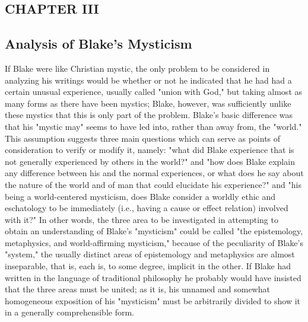 \newpage

\begin{center}
	\section[Chapter III: Analysis of Blake's Mysticism]{CHAPTER III}
	\subsection*{Analysis of Blake's Mysticism}
\end{center}

{}

If Blake were like Christian mystic, the only problem to be considered in analyzing his 
writings would be whether or not he indicated that he had had a certain unusual experience,
usually called "union with God," but taking almost as many forms as there have been mystics; Blake, however,
was sufficiently unlike these mystics that this is only part of the problem. Blake's basic difference was that
his "mystic may" seems to have led into, rather than away from, the "world." This assumption
suggests three main questions which can serve as points of consideration to verify
or modify it, namely: "what did Blake experience that is not generally experienced by others in the world?"
and "how does Blake explain any difference between his and the normal experiences, or what does he say about the 
nature of the world and of man that could elucidate his experience?" and "his being a world-centered mysticism,
does Blake consider a worldly ethic and eschatology to be immediately (i.e., having a cause or effect relation) involved
with it?" In other words, the three area to be investigated in attempting to obtain an understanding of 
Blake's "mysticism" could be called "the epistemology, metaphysics, and world-affirming
mysticism," because of the peculiarity of Blake's "system," the usually distinct
areas of epistemology and metaphysics are almost inseparable, that is, each is, to some degree,
implicit in the other. If Blake had written in the language of traditional philosophy
he probably would have insisted that the three areas must be united; as it is, his unnamed and somewhat
homogeneous exposition of his "mysticism" must be arbitrarily divided to show it in a generally comprehensible form.\par
\vspace*{0.5\baselineskip}
